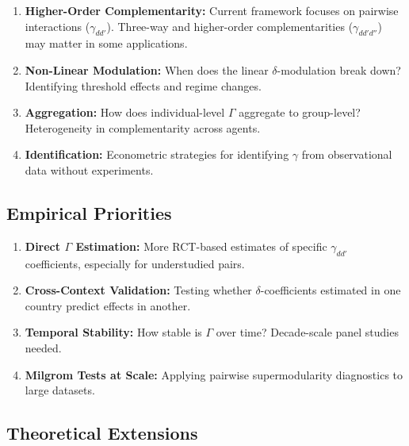 \begin{enumerate}
    \item \textbf{Higher-Order Complementarity:} Current framework focuses on 
    pairwise interactions ($\gamma_{dd'}$). Three-way and higher-order 
    complementarities ($\gamma_{dd'd''}$) may matter in some applications.
    
    \item \textbf{Non-Linear Modulation:} When does the linear $\delta$-modulation 
    break down? Identifying threshold effects and regime changes.
    
    \item \textbf{Aggregation:} How does individual-level $\Gamma$ aggregate to 
    group-level? Heterogeneity in complementarity across agents.
    
    \item \textbf{Identification:} Econometric strategies for identifying 
    $\gamma$ from observational data without experiments.
\end{enumerate}

\subsection{Empirical Priorities}

\begin{enumerate}
    \item \textbf{Direct $\Gamma$ Estimation:} More RCT-based estimates of 
    specific $\gamma_{dd'}$ coefficients, especially for understudied pairs.
    
    \item \textbf{Cross-Context Validation:} Testing whether $\delta$-coefficients 
    estimated in one country predict effects in another.
    
    \item \textbf{Temporal Stability:} How stable is $\Gamma$ over time? 
    Decade-scale panel studies needed.
    
    \item \textbf{Milgrom Tests at Scale:} Applying pairwise supermodularity 
    diagnostics to large datasets.
\end{enumerate}

\subsection{Theoretical Extensions}

